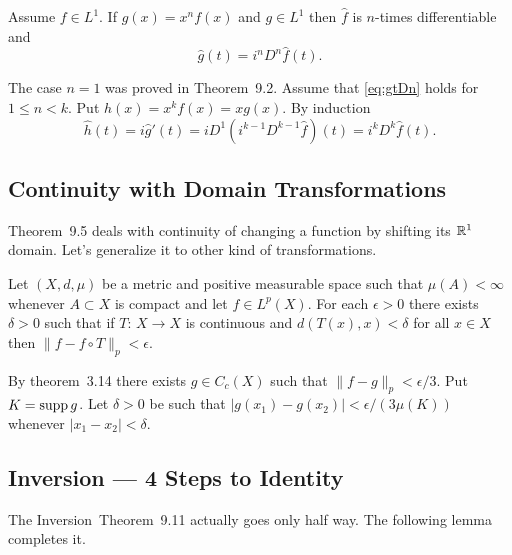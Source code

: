 \begin{llem} \label{lem:g-eq-xnf}
Assume \(f\in L^1\).
If \(g(x) = x^nf(x)\) and \(g\in L^1\) then
\(\hat{f}\) is $n$-times differentiable and
\begin{equation}
\hat{g}(t) = i^nD^n\hat{f}(t). \label{eq:gtDn}
\end{equation}
\end{llem}
\begin{thmproof}
The case \(n=1\) was proved in Theorem~9.2.
Assume that \eqref{eq:gtDn} holds for \(1\leq n < k\).
Put \(h(x) = x^kf(x) = xg(x)\). By induction
\begin{equation*}
\hat{h}(t) 
= i\hat{g}'(t) 
= iD^1\left(i^{k-1}D^{k-1}\hat{f}\right)(t)
= i^kD^k\hat{f}(t).
\end{equation*}
\end{thmproof}


\subsection{Continuity with Domain Transformations}

Theorem~9.5 deals with continuity of changing a function
by shifting its \(\mathbb{R}^1\) domain.
Let's generalize it to other kind of transformations.

\begin{llem} \label{lem:9.5:gen}
Let \((X,d,\mu)\) be a metric and positive measurable space such
that \(\mu(A)<\infty\) whenever \(A\subset X\) is compact
and let \(f\in L^p(X)\).
For each \(\epsilon>0\) there exists \(\delta > 0\) such that if 
\(T:\,X\to X\) is continuous and \(d(T(x),x)<\delta\) for all \(x\in X\)
then \(\|f - f\circ T\|_p < \epsilon\).
\end{llem}
\begin{thmproof}
By theorem~3.14 there exists \(g\in C_c(X)\) such that 
\(\|f-g\|_p < \epsilon/3\). Put \(K=\mathop{\rm supp}\nolimits g\).
Let \(\delta>0\)
be such that \(|g(x_1)-g(x_2)|<\epsilon/(3\mu(K))\) 
whenever \(|x_1-x_2|<\delta\).
\end{thmproof}


\subsection{Inversion --- 4 Steps to Identity}

The Inversion~Theorem~9.11 actually goes only half way.
The following lemma completes it.

